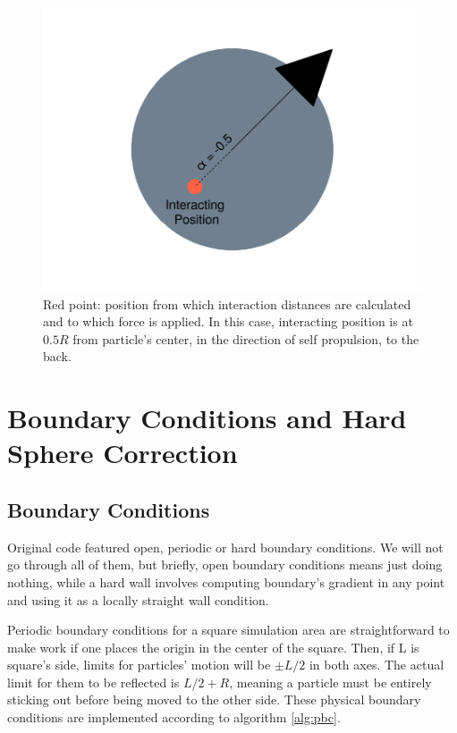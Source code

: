 \documentclass[../../master_thesis_np.tex]{subfiles}
\begin{document}
	\begin{figure}[htp]
		\centering
		\includegraphics[width=\textwidth]{singpart_draw.png}
		\caption{Red point: position from which interaction distances are calculated and to which force is applied. In this case, interacting position is at $0.5R$ from particle's center, in the direction of self propulsion, to the back.}
		\label{fig:geom_model}
	\end{figure}
	
	\section{Boundary Conditions and Hard Sphere Correction}
	\subsection{Boundary Conditions}
	Original code featured open, periodic or hard boundary conditions. We will not go through all of them, but briefly, open boundary conditions means just doing nothing, while a hard wall involves computing boundary's gradient in any point and using it as a locally straight wall condition.
	
	Periodic boundary conditions for a square simulation area are straightforward to make work if one places the origin in the center of the square. Then, if L is square's side, limits for particles' motion will be $\pm L/2$ in both axes. The actual limit for them to be reflected is $L/2 + R$, meaning a particle must be entirely sticking out before being moved to the other side. These physical boundary conditions are implemented according to algorithm \ref{alg:pbc}.
	
\end{document}
